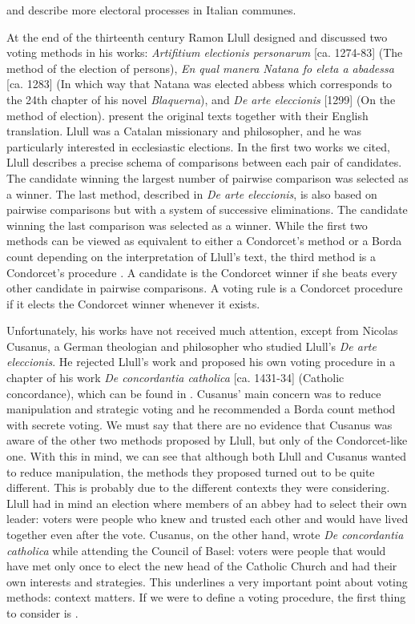 \citet{Wolfson1899} and \citet{Keller2014} describe more electoral processes in Italian communes. 

At the end of the thirteenth century Ramon Llull designed and discussed two voting methods in his works: \textit{Artifitium electionis personarum} [ca. 1274-83] (The method of the election of persons), \textit{En qual manera Natana fo eleta a abadessa} [ca. 1283] (In which way that Natana was elected abbess which corresponds to the 24th chapter of his novel \textit{Blaquerna}), and \textit{De arte eleccionis} [1299] (On the method of election). \cite{Hagele2001} present the original texts together with their English translation. Llull was a Catalan missionary and philosopher, and he was particularly interested in ecclesiastic elections. In the first two works we cited, Llull describes a precise schema of comparisons between each pair of candidates. The candidate winning the largest number of pairwise comparison was selected as a winner. The last method, described in \textit{De arte eleccionis}, is also based on pairwise comparisons but with a system of successive eliminations. The candidate winning the last comparison was selected as a winner. While the first two methods can be viewed as equivalent to either a Condorcet's method or a Borda count depending on the interpretation of Llull's text, the third method is a Condorcet's procedure \citep{McLean1990}. A candidate is the Condorcet winner if she beats every other candidate in pairwise comparisons. A voting rule is a Condorcet procedure if it elects the Condorcet winner whenever it exists.

Unfortunately, his works have not received much attention, except from Nicolas Cusanus, a German theologian and philosopher who studied Llull's \textit{De arte eleccionis}. He rejected Llull's work and proposed his own voting procedure in a chapter of his work \textit{De concordantia catholica} [ca. 1431-34] (Catholic concordance), which can be found in \citet[Chapter 4]{McLeanUrken1995}. Cusanus' main concern was to reduce manipulation and strategic voting and he recommended a Borda count method with secrete voting. We must say that there are no evidence that Cusanus was aware of the other two methods proposed by Llull, but only of the Condorcet-like one. With this in mind, we can see that although both Llull and Cusanus wanted to reduce manipulation, the methods they proposed turned out to be quite different.
This is probably due to the different contexts they were considering. Llull had in mind an election where members of an abbey had to select their own leader: voters were people who knew and trusted each other and would have lived together even after the vote. Cusanus, on the other hand, wrote \textit{De concordantia catholica} while attending the Council of Basel: voters were people that would have met only once to elect the new head of the Catholic Church and had their own interests and strategies. This underlines a very important point about voting methods: context matters. If we were to define a voting procedure, the first thing to consider is .

